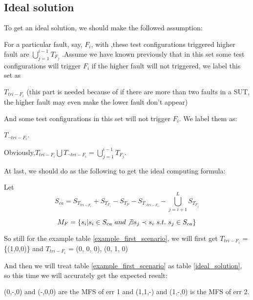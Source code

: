 \documentclass{sig-alternate}
\begin{document}
\subsection{Ideal solution}
To get an ideal solution, we should make the followed assumption:

For a particular fault, say, $F_{i}$, with ,these test configurations triggered higher fault are  $ \bigcup_{j = 1}^{i-1}T_{F_{j}}$ .Assume we have known previously that in this set some test configurations will trigger $F_{i}$ if the higher fault will not triggered, we label this set as

$ T_{tri-F_{i}}$ (this part is needed because of if there are more than two faults in a SUT, the higher fault may even make the lower fault don't appear)

And some test configurations in this set will not trigger $F_{i}$. We label them as:

$ T_{\neg tri-F_{i}}$.

Obviously,$ T_{tri-F_{i}}\bigcup T_{\neg tri-F_{i}} = \bigcup_{j = 1}^{i-1}T_{F_{j}}$.


At last, we should do as the following to get the ideal computing formula:


Let $$S_{ca} = S_{T_{tri-F_{i}}} + S_{T_{F_{i}}} - S_{T_{P}} -  S_{T_{\neg tri-F_{i}}} - \bigcup_{j = i+1}^{L}S_{T_{F_{j}}} $$

$$M_{F} = \{s_{i} | s_{i} \in S_{ca}\ and \not\exists s_{j} \prec s_{i}\ s.t.\ s_{j} \in S_{ca} \}$$

So still for the example table \ref{example_first_scenario}, we will first get
$ T_{tri-F_{i}}$ = \{(1,0,0)\} and $ T_{tri-F_{i}}$ = { (0, 0, 0), (0, 1, 0)}

And then we will treat table \ref{example_first_scenario} as table \ref{ideal_solution}, so this time we will accurately get the expected result:

(0,-,0) and (-,0,0) are the MFS of err 1 and (1,1,-) and (1,-,0) is the MFS of err 2.
\end{document}
